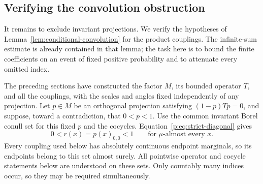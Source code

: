 \subsection{Verifying the convolution obstruction}\label{p:sec:obstruction}

It remains to exclude invariant projections. We verify the hypotheses
of Lemma~\ref{lem:conditional-convolution} for the product couplings.
The infinite-sum estimate is already contained in that lemma; the task
here is to bound the finite coefficients on an event of fixed positive
probability and to attenuate every omitted index.

The preceding sections have constructed the factor $M$, its bounded
operator $T$, and all the couplings, with the scales and angles fixed
independently of any projection.  Let $p\in M$ be an orthogonal projection satisfying
$(1-p)Tp=0$, and suppose, toward a contradiction, that $0<p<1$.
Use the common invariant Borel conull set for this fixed $p$ and the
cocycles.  Equation~\eqref{p:eq:strict-diagonal} gives
\[
 0<r(x)=p(x)_{0,0}<1\qquad\text{for }\mu\text{-almost every }x.
\]
Every coupling used below has absolutely continuous endpoint
marginals, so its endpoints belong to this set almost surely.  All
pointwise operator and cocycle statements below are understood on
these sets.  Only countably many indices occur, so they may be
required simultaneously.

